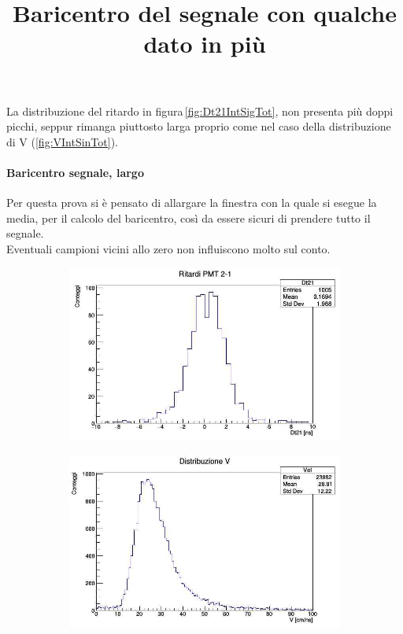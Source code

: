 \documentclass[a4paper,twocolumn]{article}
\begin{document}
La distribuzione del ritardo in figura\,\ref{fig:Dt21IntSigTot}, non presenta più doppi picchi, seppur rimanga piuttosto larga proprio come nel caso della distribuzione di V (\ref{fig:VIntSinTot}).

\paragraph{Baricentro segnale, largo}
Per questa prova si è pensato di allargare la finestra con la quale si esegue la media, per il calcolo del baricentro, così da essere sicuri di prendere tutto il segnale.\\
Eventuali campioni vicini allo zero non influiscono molto sul conto.

\begin{figure}[H]
     \centering
     \title{Baricentro del segnale con qualche dato in più}
     \begin{center}
     \begin{subfigure}[b]{0.4\textwidth}
         \centering
         \includegraphics[width=\textwidth]{./immagini/TimeOfFlight/Rit21Largo.jpg}
         \caption{}
         \label{fig:Dt21Largo}
     \end{subfigure}
     \hfill
     \begin{subfigure}[b]{0.4\textwidth}
         \centering
         \includegraphics[width=\textwidth]{./immagini/TimeOfFlight/VLargo.jpg}

\end{subfigure}
\end{center}
\end{figure}
\end{document}
